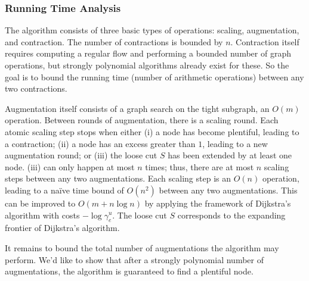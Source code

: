 \documentclass[11pt]{article}
\theoremstyle{definition}
\theoremstyle{definition}
\begin{document}
		\subsubsection{Running Time Analysis}
		The algorithm consists of three basic types of operations: scaling, augmentation, and contraction.
		The number of contractions is bounded by $n$. Contraction itself
		requires computing a regular flow and performing a bounded number of graph operations, but
		strongly polynomial algorithms already exist for these. So the goal is to bound the running time
		(number of arithmetic operations) between any two contractions.
		
		Augmentation itself consists of a graph search on the tight subgraph, an $O(m)$ operation.
		Between rounds of augmentation, there is a scaling round. Each atomic scaling step stops
		when either (i) a node has become plentiful, leading to a contraction; (ii) a node has an
		excess greater than $1$, leading to a new augmentation round; or (iii) the loose cut
		$S$ has been extended by at least one node. (iii) can only happen at most $n$ times; thus,
		there are at most $n$ scaling steps between any two augmentations. Each scaling step
		is an $O(n)$ operation, leading to a na\"ive time bound of $O(n^2)$ between any two augmentations.
		This can be improved to $O(m + n \log n)$ by applying the framework of Dijkstra's
		algorithm with costs $-\log \gamma^u_e$. The loose cut $S$ corresponds to the expanding
		frontier of Dijkstra's algorithm.
		
		It remains to bound the total number of augmentations the algorithm may perform. We'd
		like to show that after a strongly polynomial number of augmentations, the algorithm
		is guaranteed to find a plentiful node.
		
\end{document}
